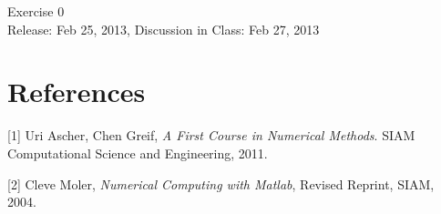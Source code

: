 \documentclass[11pt,a4paper,twoside]{article} %
\begin{document}
\begin{center}   
    \LARGE
    Exercise 0 \\
    Release: Feb 25, 2013, Discussion in Class: Feb 27, 2013  \\[1em]
\end{center}

\newcommand{\wtg}{\ding{220}}







\section*{References}
 [1] Uri Ascher, Chen Greif, {\sl A First Course in Numerical Methods}. SIAM Computational Science and Engineering, 2011.

 [2] Cleve Moler, {\sl  Numerical Computing with Matlab}, Revised Reprint, SIAM, 2004.
\label{lastpage}
\end{document}
